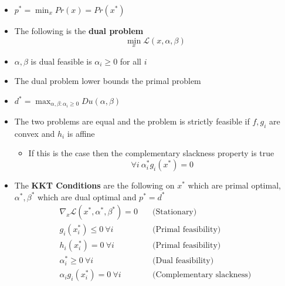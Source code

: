 \documentclass[a4, english]{article}
\begin{document}
\begin{itemize}
  \item $p^* = \min_x Pr(x) = Pr(x^*)$ 	
  \item The following is the \textbf{dual problem} 
  \begin{equation*}
    \min_x \mathcal L (x, \alpha, \beta)
  \end{equation*}
  \item $\alpha, \beta$ is dual feasible is $\alpha_i \geq 0$ for all $i$ 
 	\item The dual problem lower bounds the primal problem 
  \item $d^* = \max _{\alpha,\beta: \alpha_i \geq0} Du(\alpha, \beta)$ 
  \item The two problems are equal and the problem is strictly feasible if $f,g_i$ are convex and $h_i$ is affine 
  \begin{itemize}
  	\item If this is the case then the complementary slackness property is true
    \begin{equation*}
      \forall i \ \alpha_i^*g_i(x^*) = 0 
    \end{equation*} 
  \end{itemize}
  \item The \textbf{KKT Conditions} are the following on $x^*$ which are primal optimal, $\alpha^*,\beta^*$ which are dual optimal and $p^*=d^*$  
\begin{align*}
  \nabla_x  \mathcal L(x^*,\alpha^*,\beta^*) = 0 &\quad \text{(Stationary)} \\
                    g_i(x_i^*)\leq 0 \ \forall i &\quad \text{(Primal feasibility)} \\
                      h_i(x_i^*) = 0 \ \forall i &\quad \text{(Primal feasibility)}\\
                   \alpha_i^* \geq 0 \ \forall i &\quad \text{(Dual feasibility)}\\
             \alpha_i g_i(x_i^*) = 0 \ \forall i &\quad \text{(Complementary slackness)}
\end{align*}

\end{itemize}
\end{document}
